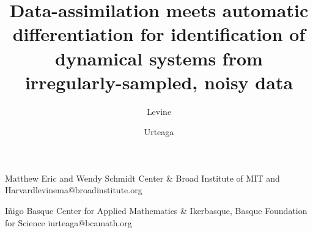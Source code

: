 \documentclass[communication]{CEDYA}
\begin{document}
%




\title{Data-assimilation meets automatic differentiation for identification of dynamical systems from irregularly-sampled, noisy data}

\begin{authors}
	\author{Levine}{Matthew}{
	Eric and Wendy Schmidt Center \& 
	Broad Institute of MIT and Harvard}{levinema@broadinstitute.org }
\author*{Urteaga}{I\~nigo}{
	Basque Center for Applied Mathematics \&
	Ikerbasque, Basque Foundation
	for Science
}{iurteaga@bcamath.org}
\end{authors}

\end{document}
